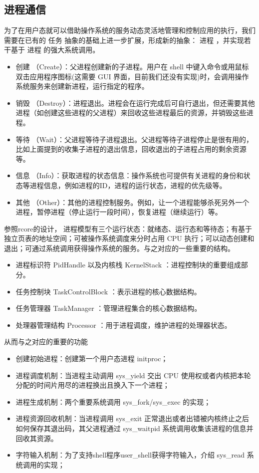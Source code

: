\subsection{进程通信}
为了在用户态就可以借助操作系统的服务动态灵活地管理和控制应用的执行，我们需要在已有的 任务 抽象的基础上进一步扩展，形成新的抽象： 进程 ，并实现若干基于 进程 的强大系统调用。

\begin{itemize}
\item 创建 （Create）：父进程创建新的子进程。用户在 shell 中键入命令或用鼠标双击应用程序图标(这需要 GUI 界面，目前我们还没有实现)时，会调用操作系统服务来创建新进程，运行指定的程序。
\item 销毁 （Destroy）：进程退出。进程会在运行完成后可自行退出，但还需要其他进程（如创建这些进程的父进程）来回收这些进程最后的资源，并销毁这些进程。
\item 等待 （Wait）：父进程等待子进程退出。父进程等待子进程停止是很有用的，比如上面提到的收集子进程的退出信息，回收退出的子进程占用的剩余资源等。
\item 信息 （Info）：获取进程的状态信息：操作系统也可提供有关进程的身份和状态等进程信息，例如进程的ID，进程的运行状态，进程的优先级等。
\item 其他 （Other）：其他的进程控制服务。例如，让一个进程能够杀死另外一个进程，暂停进程（停止运行一段时间），恢复进程（继续运行）等。
\end{itemize}

参照rcore的设计， 进程模型有三个运行状态：就绪态、运行态和等待态；有基于独立页表的地址空间；可被操作系统调度来分时占用 CPU 执行；可以动态创建和退出；可通过系统调用获得操作系统的服务。与之对应的一些重要的结构。

\begin{itemize}
\item 进程标识符 PidHandle 以及内核栈 KernelStack ：进程控制块的重要组成部分。
\item 任务控制块 TaskControlBlock ：表示进程的核心数据结构。
\item 任务管理器 TaskManager ：管理进程集合的核心数据结构。
\item 处理器管理结构 Processor ：用于进程调度，维护进程的处理器状态。
\end{itemize}

从而与之对应的重要的功能

\begin{itemize}
\item 创建初始进程：创建第一个用户态进程 initproc；
\item 进程调度机制：当进程主动调用 sys\_yield 交出 CPU 使用权或者内核把本轮分配的时间片用尽的进程换出且换入下一个进程；
\item 进程生成机制：两个重要系统调用 sys\_fork/sys\_exec 的实现；
\item 进程资源回收机制：当进程调用 sys\_exit 正常退出或者出错被内核终止之后如何保存其退出码，其父进程通过 sys\_waitpid 系统调用收集该进程的信息并回收其资源。
\item 字符输入机制：为了支持shell程序user\_shell获得字符输入，介绍 sys\_read 系统调用的实现；
\end{itemize}

